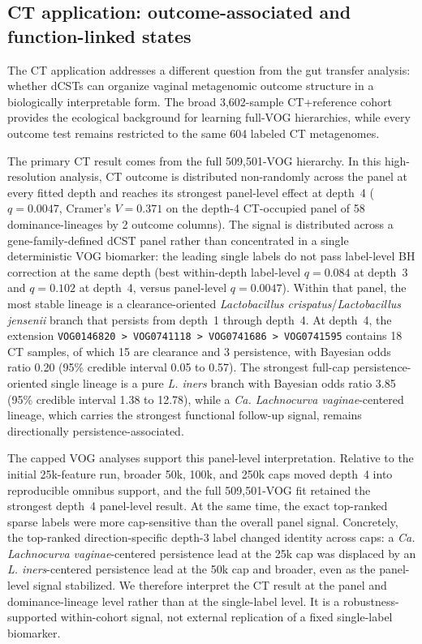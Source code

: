 \documentclass[11pt]{article}
\newcommand{\taxon}[1]{\emph{#1}}
\begin{document}
\FloatBarrier

\subsection{CT application: outcome-associated and function-linked states}

The CT application addresses a different question from the gut transfer
analysis: whether dCSTs can organize vaginal metagenomic outcome structure in a
biologically interpretable form. The broad
3,602-sample CT+reference cohort provides the ecological background for
learning full-VOG hierarchies, while every outcome test remains restricted to
the same 604 labeled CT metagenomes.

The primary CT result comes from the full 509,501-VOG hierarchy. In this
high-resolution analysis, CT outcome is distributed non-randomly across the
panel at every fitted depth and reaches its strongest panel-level effect at
depth~4 ($q = 0.0047$, Cramer's $V = 0.371$ on the depth-4 CT-occupied panel of
58 dominance-lineages by 2 outcome columns). The signal is distributed across
a gene-family-defined dCST panel rather than concentrated in a single
deterministic VOG biomarker: the leading single labels do not pass label-level
BH correction at the same depth (best
within-depth label-level $q = 0.084$ at depth~3 and $q = 0.102$ at depth~4,
versus panel-level $q = 0.0047$). Within that panel, the most stable lineage
is a clearance-oriented
\taxon{Lactobacillus crispatus}/\taxon{Lactobacillus jensenii} branch that
persists from depth~1 through depth~4. At depth~4, the extension
\texttt{VOG0146820 > VOG0741118 > VOG0741686 > VOG0741595} contains 18 CT
samples, of which 15 are clearance and 3 persistence, with Bayesian odds ratio
0.20 (95\% credible interval 0.05 to 0.57). The strongest full-cap
persistence-oriented single lineage is a pure \taxon{L. iners} branch with
Bayesian odds ratio 3.85 (95\% credible interval 1.38 to 12.78), while a
\taxon{Ca. Lachnocurva vaginae}-centered lineage, which carries the strongest
functional follow-up signal, remains directionally persistence-associated.

The capped VOG analyses support this panel-level interpretation. Relative to
the initial 25k-feature run, broader 50k, 100k, and 250k caps moved depth~4 into
reproducible omnibus support, and the full 509,501-VOG fit retained the strongest
depth~4 panel-level result. At the same time, the exact top-ranked sparse labels
were more cap-sensitive than the overall panel signal. Concretely, the
top-ranked direction-specific depth-3 label changed identity across caps:
a \taxon{Ca. Lachnocurva vaginae}-centered persistence lead at the 25k cap was
displaced by an \taxon{L. iners}-centered persistence lead at the 50k cap and
broader, even as the panel-level signal stabilized. We therefore interpret the
CT result at the panel and dominance-lineage level rather than at the
single-label level. It is a robustness-supported within-cohort signal, not
external replication of a fixed single-label biomarker.
\end{document}
